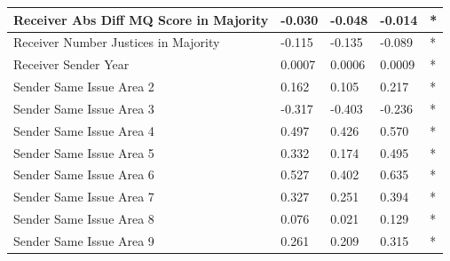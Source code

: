 \documentclass[headsepline=true, abstracton]{scrartcl}
\begin{document}
\begin{table}[htp]
\begin{tabular}{|
>{\columncolor[HTML]{EFEFEF}}l |l|l|l|l|}
Receiver Abs Diff MQ Score in Majority             & -0.030                           & -0.048                              & -0.014                              & *                                    \\ \hline
Receiver Number Justices in Majority               & -0.115                           & -0.135                              & -0.089                              & *                                    \\ \hline
Receiver  Sender Year                              & 0.0007                           & 0.0006                              & 0.0009                              & *                                    \\ \hline
Sender Same Issue Area 2                           & 0.162                            & 0.105                               & 0.217                               & *                                    \\ \hline
Sender Same Issue Area 3                           & -0.317                           & -0.403                              & -0.236                              & *                                    \\ \hline
Sender Same Issue Area 4                           & 0.497                            & 0.426                               & 0.570                               & *                                    \\ \hline
Sender Same Issue Area 5                           & 0.332                            & 0.174                               & 0.495                               & *                                    \\ \hline
Sender Same Issue Area 6                           & 0.527                            & 0.402                               & 0.635                               & *                                    \\ \hline
Sender Same Issue Area 7                           & 0.327                            & 0.251                               & 0.394                               & *                                    \\ \hline
Sender Same Issue Area 8                           & 0.076                            & 0.021                               & 0.129                               & *                                    \\ \hline
Sender Same Issue Area 9                           & 0.261                            & 0.209                               & 0.315                               & *                                    \\ \hline

\end{tabular}
\end{table}
\end{document}
